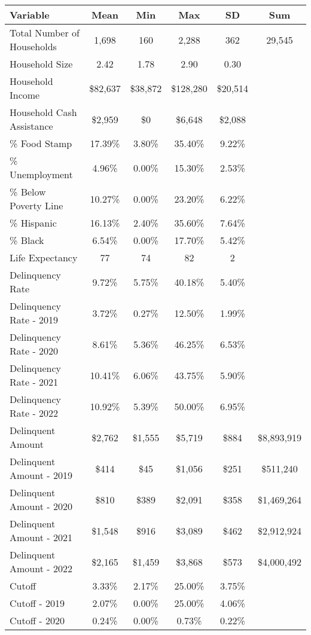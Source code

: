 \begin{tabular}{l|c|c|c|c|c}
\toprule 
\midrule 
Variable & Mean & Min & Max & SD & Sum \\
\midrule 
Total Number of Households & 1,698 & 160 & 2,288 & 362 & 29,545 \\
\quad Household Size & 2.42 & 1.78 & 2.90 & 0.30 \\
Household Income & \$82,637 & \$38,872 & \$128,280 & \$20,514 \\
\quad Household Cash Assistance & \$2,959 & \$0 & \$6,648 & \$2,088 \\
\% Food Stamp & 17.39\% & 3.80\% & 35.40\% & 9.22\% \\
\% Unemployment & 4.96\% & 0.00\% & 15.30\% & 2.53\% \\
\% Below Poverty Line & 10.27\% & 0.00\% & 23.20\% & 6.22\% \\
\% Hispanic & 16.13\% & 2.40\% & 35.60\% & 7.64\% \\
\% Black & 6.54\% & 0.00\% & 17.70\% & 5.42\% \\
Life Expectancy & 77 & 74 & 82 & 2 \\
\midrule 
Delinquency Rate & 9.72\% & 5.75\% & 40.18\% & 5.40\% \\
\quad Delinquency Rate - 2019 & 3.72\% & 0.27\% & 12.50\% & 1.99\% \\
\quad Delinquency Rate - 2020 & 8.61\% & 5.36\% & 46.25\% & 6.53\% \\
\quad Delinquency Rate - 2021 & 10.41\% & 6.06\% & 43.75\% & 5.90\% \\
\quad Delinquency Rate - 2022 & 10.92\% & 5.39\% & 50.00\% & 6.95\% \\
\midrule 
Delinquent Amount & \$2,762 & \$1,555 & \$5,719 & \$884 & \$8,893,919 \\
\quad Delinquent Amount - 2019 & \$414 & \$45 & \$1,056 & \$251 & \$511,240 \\
\quad Delinquent Amount - 2020 & \$810 & \$389 & \$2,091 & \$358 & \$1,469,264 \\
\quad Delinquent Amount - 2021 & \$1,548 & \$916 & \$3,089 & \$462 & \$2,912,924 \\
\quad Delinquent Amount - 2022 & \$2,165 & \$1,459 & \$3,868 & \$573 & \$4,000,492 \\
\midrule 
Cutoff & 3.33\% & 2.17\% & 25.00\% & 3.75\% \\
\quad Cutoff - 2019 & 2.07\% & 0.00\% & 25.00\% & 4.06\% \\
\quad Cutoff - 2020 & 0.24\% & 0.00\% & 0.73\% & 0.22\% \\

\end{tabular}
